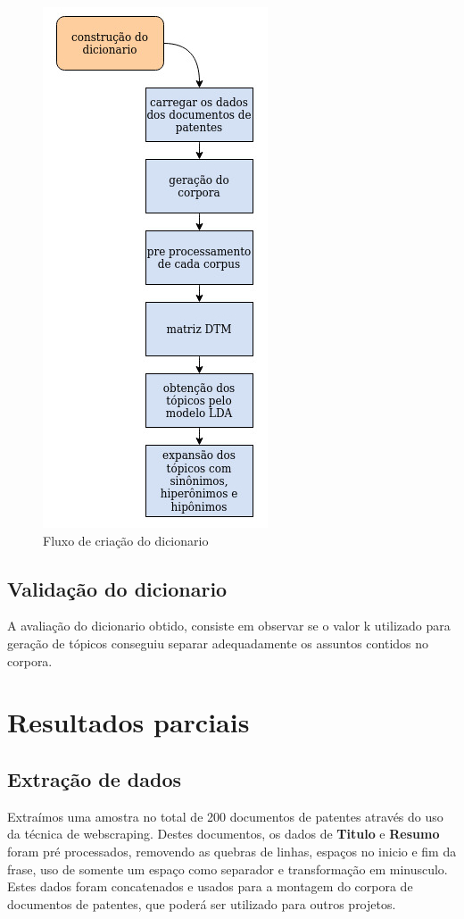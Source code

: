 \begin{figure}[ht!]
	\centering
	\includegraphics[scale=0.5]{imagens/tcc_dicionario.jpg}
	\caption{Fluxo de criação do dicionario
			 \label{dicionario_flow_image}}
\end{figure}

\subsection{Validação do dicionario}
A avaliação do dicionario obtido, consiste em observar se o valor k utilizado para geração de tópicos conseguiu separar adequadamente os assuntos contidos no corpora.

\section{Resultados parciais}

\subsection{Extração de dados}

Extraímos uma amostra no total de 200 documentos de patentes através do uso da técnica de webscraping. Destes documentos, os dados de \textbf{Titulo} e \textbf{Resumo} foram pré processados, removendo as quebras de linhas, espaços no inicio e fim da frase, uso de somente um espaço como separador e transformação em minusculo. Estes dados foram concatenados e usados para a montagem do corpora de documentos de patentes, que poderá ser utilizado para outros projetos.

